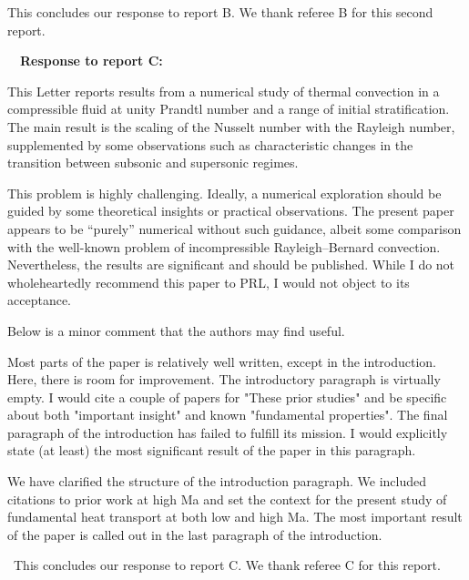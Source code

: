 \documentclass[aps, 11pt, singlecolumn]{revtex4-1} %
\begin{document}
\begin{singlespace}
\noindent
This concludes our response to report B.  We thank referee B for this second report.




$\,$
\newline
$\,$
\newline
\noindent
\Large{\textbf{Response to report C:}}\newline$\,$\newline\indent

\begin{myquotation}
This Letter reports results from a numerical study of thermal
convection in a compressible fluid at unity Prandtl number and a range
of initial stratification. The main result is the scaling of the
Nusselt number with the Rayleigh number, supplemented by some
observations such as characteristic changes in the transition between
subsonic and supersonic regimes.

This problem is highly challenging. Ideally, a numerical exploration
should be guided by some theoretical insights or practical
observations. The present paper appears to be ``purely'' numerical
without such guidance, albeit some comparison with the well-known
problem of incompressible Rayleigh--Bernard convection. Nevertheless,
the results are significant and should be published. While I do not
wholeheartedly recommend this paper to PRL, I would not object to its
acceptance.

Below is a minor comment that the authors may find useful.

Most parts of the paper is relatively well written, except in the
introduction. Here, there is room for improvement. The introductory
paragraph is virtually empty. I would cite a couple of papers for
"These prior studies" and be specific about both "important insight"
and known "fundamental properties". The final paragraph of the
introduction has failed to fulfill its mission. I would explicitly
state (at least) the most significant result of the paper in this
paragraph.
\end{myquotation}
We have clarified the structure of the introduction paragraph.  We included
citations to prior work at high Ma and set the context for the present study
of fundamental heat transport at both low and high Ma.
The
most important result of the paper is called out in the last paragraph of the
introduction.

$\,$\newline\noindent
This concludes our response to report C.  We thank referee C for this report.

$\,$
\newline
\noindent


\end{singlespace}





\end{document}
